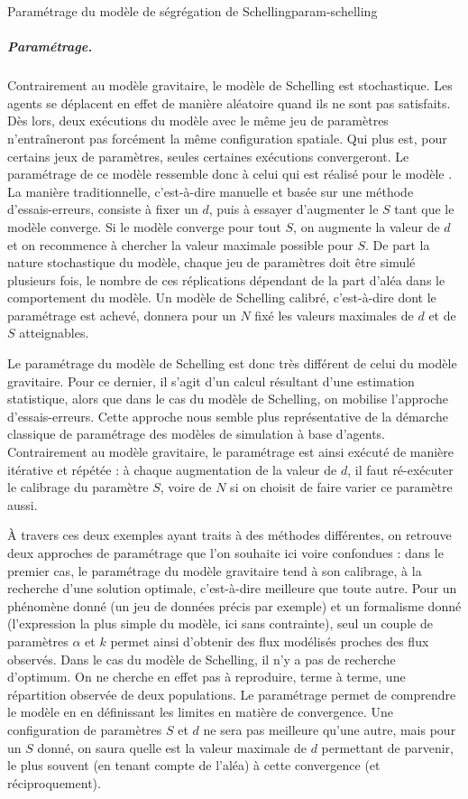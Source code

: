 \begin{encadre}{Paramétrage du modèle de ségrégation de Schelling}{param-schelling}
\subparagraph{Paramétrage.}
Contrairement au modèle gravitaire, le modèle de Schelling est stochastique.
Les agents se déplacent en effet de manière aléatoire quand ils ne sont pas satisfaits.
Dès lors, deux exécutions du modèle avec le même jeu de paramètres n'entraîneront pas forcément la même configuration spatiale.
Qui plus est, pour certains jeux de paramètres, seules certaines exécutions convergeront.
Le paramétrage de ce modèle ressemble donc à celui qui est réalisé pour le modèle \simfeodal{}.
La manière \og traditionnelle\fg{}, c'est-à-dire manuelle et basée sur une méthode d'essais-erreurs, consiste à fixer un $d$, puis à essayer d'augmenter le $S$ tant que le modèle converge.
Si le modèle converge pour tout $S$, on augmente la valeur de $d$ et on recommence à chercher la valeur maximale possible pour $S$.
De part la nature stochastique du modèle, chaque jeu de paramètres doit être simulé plusieurs fois, le nombre de ces réplications dépendant de la part d'aléa dans le comportement du modèle.
Un modèle de Schelling calibré, c'est-à-dire dont le paramétrage est achevé,
donnera pour un $N$ fixé les valeurs maximales de $d$ et de $S$ atteignables.
\end{encadre}

Le paramétrage du modèle de Schelling est donc très différent de celui du modèle gravitaire.
Pour ce dernier, il s'agit d'un calcul résultant d'une estimation statistique, alors que dans le cas du modèle de Schelling, on mobilise l'approche d'essais-erreurs.
Cette approche nous semble plus représentative de la démarche classique de paramétrage des modèles de simulation à base d'agents.
Contrairement au modèle gravitaire, le paramétrage est ainsi exécuté de manière itérative et répétée : à chaque augmentation de la valeur de $d$, il faut ré-exécuter le calibrage du paramètre $S$, voire de $N$ si on choisit de faire varier ce paramètre aussi.


À travers ces deux exemples ayant traits à des méthodes différentes, on retrouve deux approches de paramétrage que l'on souhaite ici voire confondues :
	dans le premier cas, le paramétrage du modèle gravitaire tend à son calibrage, à la recherche d'une solution optimale, c'est-à-dire meilleure que toute autre.
Pour un phénomène donné (un jeu de données précis par exemple) et un formalisme donné (l'expression la plus simple du modèle, ici sans contrainte), seul un couple de paramètres $\alpha$ et $k$ permet ainsi d'obtenir des flux modélisés proches des flux observés.
Dans le cas du modèle de Schelling, il n'y a pas de recherche d'optimum.
On ne cherche en effet pas à reproduire, terme à terme, une répartition observée de deux populations.
Le paramétrage permet de comprendre le modèle en en définissant les limites en matière de convergence.
Une configuration de paramètres $S$ et $d$ ne sera pas meilleure qu'une autre, mais pour un $S$ donné, on saura quelle est la valeur maximale de $d$ permettant de parvenir, le plus souvent (en tenant compte de l'aléa) à cette convergence (et réciproquement).

